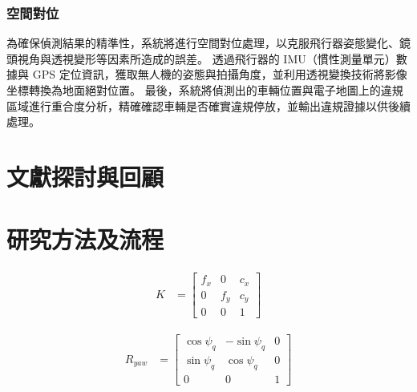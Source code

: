 \documentclass[12pt]{article}       %
\begin{document}
\subsubsection{空間對位}
\hspace{2em}為確保偵測結果的精準性，系統將進行空間對位處理，以克服飛行器姿態變化、鏡頭視角與透視變形等因素所造成的誤差。
透過飛行器的 IMU（慣性測量單元）數據與 GPS 定位資訊，獲取無人機的姿態與拍攝角度，並利用透視變換技術將影像坐標轉換為地面絕對位置。
最後，系統將偵測出的車輛位置與電子地圖上的違規區域進行重合度分析，精確確認車輛是否確實違規停放，並輸出違規證據以供後續處理。

\section{\centering 文獻探討與回顧}
\hspace{2em}




\section{\centering 研究方法及流程}
\hspace{2em}


\begin{align}
    K &=
    \begin{bmatrix}
        f_{x}       & 0             & c_{x}     \\
        0           & f_{y}         & c_{y}     \\
        0           & 0             & 1
    \end{bmatrix} 
    \label{eq:k}
\end{align}

\begin{align}
    R_{yaw} &=
    \begin{bmatrix}
        \cos\psi_{q}   & -\sin\psi_{q}  & 0 \\
        \sin\psi_{q}   & \cos\psi_{q}   & 0 \\
        0              & 0              & 1
    \end{bmatrix} 
    \label{eq:ryaw}
\end{align}
\end{document}
